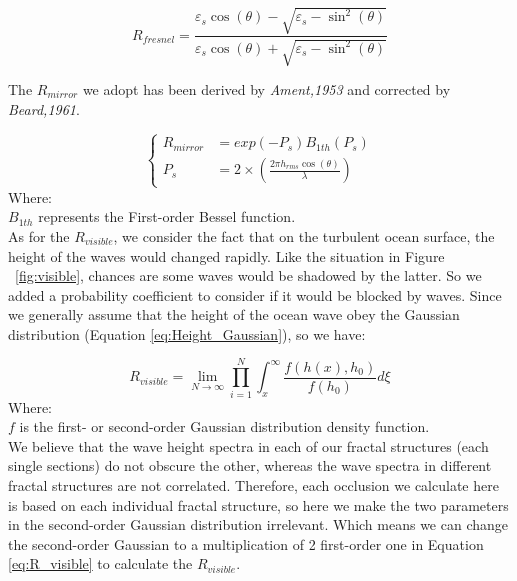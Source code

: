 \documentclass{mcmthesis}
\begin{document}
      \begin{equation}\label{eq:R_Fesnel}
        R_{fresnel} = \frac{\varepsilon_s \cos(\theta) - \sqrt{\varepsilon_s - \sin^2(\theta)}}{\varepsilon_s \cos(\theta) + \sqrt{\varepsilon_s - \sin^2(\theta)}}
      \end{equation}

    The $R_{mirror}$ we adopt has been derived by \emph{Ament,1953}\cite{ament1953toward} and corrected by \emph{Beard,1961}\cite{beard1961coherent}.

    \begin{equation}\label{eq:R_mirror}
    \left\{
    \begin{aligned}
        R_{mirror} &= exp(- P_s) B_{1th}(P_s) \\
        P_s &= 2 \times (\frac{2\pi h_{rms} \cos(\theta)}{\lambda})
    \end{aligned}
    \right.
    \end{equation}
    Where:\\
    $B_{1th}$ represents the First-order Bessel function.\\

    As for the $R_{visible}$, we consider the fact that on the turbulent ocean surface, the height of the waves would changed rapidly. Like the situation in Figure ~\ref{fig:visible}, chances are some waves would be shadowed by the latter. So we added a probability coefficient to consider if it would be blocked by waves. Since we generally assume that the height of the ocean wave obey the Gaussian distribution (Equation \ref{eq:Height_Gaussian}), so we have:

    \begin{equation}\label{eq:R_visible}
      R_{visible} = \lim_{N \to \infty} \prod_{i=1}^N \int_{x}^{\infty} \frac{f(h(x),h_0)}{f(h_0)}d\xi
    \end{equation}
    Where:\\
    $f$ is the first- or second-order Gaussian distribution density function.\\

    We believe that the wave height spectra in each of our fractal structures (each single sections) do not obscure the other, whereas the wave spectra in different fractal structures are not correlated. Therefore, each occlusion we calculate here is based on each individual fractal structure, so here we make the two parameters in the second-order Gaussian distribution irrelevant. Which means we can change the second-order Gaussian to a multiplication of 2 first-order one in Equation \ref{eq:R_visible} to calculate the $R_{visible}$.
\end{document}
